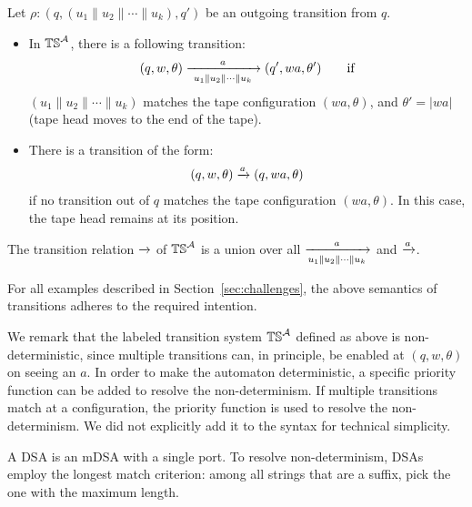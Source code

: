 Let $\rho: (q, (u_1 \parallel u_2 \parallel \cdots \parallel u_k), q')$ be an outgoing transition from $q$. 
\begin{itemize}
\item In $\mathbb{TS}^{\mathcal{A}}$, there is a following transition:
\begin{align*}
 (q, w, \theta) \xrightarrow[~u_1 \parallel u_2 \parallel \cdots \parallel u_k~]{a} (q', wa, \theta') \qquad \text{if}
\end{align*}
$(u_1 \parallel u_2 \parallel \cdots \parallel u_k)$ matches the tape configuration $(wa, \theta)$, and $\theta' = |wa|$ (tape head moves to the end of the tape).
\item There is a transition of the form:
\begin{align*}
  (q, w, \theta) \xrightarrow{a} (q, wa, \theta)
\end{align*}
if no transition out of $q$ matches the tape configuration $(wa, \theta)$. In this case, the tape head remains at its position.
\end{itemize} 

The transition relation $\xrightarrow{}$ of $\mathbb{TS}^{\mathcal{A}}$ is a union over all $\xrightarrow[u_1 \parallel u_2 \parallel \cdots \parallel u_k]{a}$ and $\xrightarrow{a}$. 

 For all examples described in Section~\ref{sec:challenges}, the above semantics of transitions adheres to the required intention. 

\begin{remark}
We remark that the labeled transition system $\mathbb{TS}^{\mathcal{A}}$ defined as above is non-deterministic, since multiple transitions can, in principle, be enabled at $(q, w, \theta)$ on seeing an $a$.  In order to make the automaton deterministic, a specific priority function can be added to resolve the non-determinism. If multiple transitions match at a configuration, the priority function is used to resolve the non-determinism. We did not explicitly add it to the syntax for technical simplicity.
\end{remark}

\begin{remark}
A DSA is an mDSA with a single port. To resolve non-determinism, DSAs employ the longest match criterion: among all strings that are a suffix, pick the one with the maximum length.
\end{remark}














  
